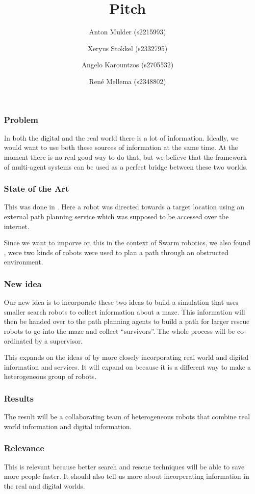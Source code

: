 \documentclass[a4paper,10pt]{article}
\title{Pitch}
\author{Anton Mulder (s2215993) \and Xeryus Stokkel (s2332795) \and Angelo
    Karountzos (s2705532) \and Ren\'e Mellema (s2348802)}
\date{}
\begin{document}
\maketitle

\subsubsection*{Problem}
In both the digital and the real world there is a lot of information.
Ideally, we would want to use both these sources of information at the same
time. At the moment there is no real good way to do that, but we believe
that the framework of multi-agent systems can be used as a perfect bridge
between these two worlds. 

\subsubsection*{State of the Art}
This was done in \citet{intframe}. Here a robot was directed towards
a target location using an external path planning service which was
supposed to be accessed over the internet. 

Since we want to imporve on this in the context of Swarm robotics, we also
found \citet{selforg}, were two kinds of robots were used to plan a path
through an obstructed environment. 

\subsubsection*{New idea}
Our new idea is to incorporate these two ideas to build a simulation that uses
smaller search robots to collect information about a maze. This information will
then be handed over to the path planning agents to build a path for larger
rescue robots to go into the maze and collect ``survivors''. The whole
process will be co-ordinated by a supervisor. 

This expands on the ideas of
\citet{intframe} by more closely incorporating real world and digital
information and services. It will expand on \citet{selforg} because it is a
different way to make a heterogeneous group of robots.

\subsubsection*{Results}
The result will be a collaborating team of heterogeneous robots that
combine real world information and digital information. 

\subsubsection*{Relevance}
This is relevant because better search and rescue techniques will be able
to save more people faster. It should also tell us more about incorperating
information in the real and digital worlds. 



\end{document}
